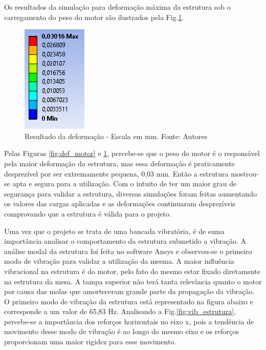       Os resultados da simulação para deformação máxima da estrutura sob o carregamento do peso do motor  são ilustrados pela Fig.\ref{fig:result}.

  \begin{figure}[H]
      \centering
      \includegraphics[scale=0.7]{figuras/result.png}
      \caption{Resultado da deformação - Escala em mm. Fonte: Autores}
      \label{fig:result}
      \end{figure}

      Pelas Figuras \ref{fig:def_motor} e \ref{fig:result}, percebe-se que o peso do motor é o responsável pela maior deformação da estrutura, mas essa deformação é praticamente desprezível por ser extremamente pequena, 0,03 mm. Então a estrutura mostrou-se apta e segura para a utilização.
    Com o intuito de ter um maior grau de segurança para validar a estrutura, diversas simulações foram feitas aumentando os valores das cargas aplicadas e as deformações continuaram desprezíveis comprovando que a estrutura é válida para o projeto.


    Uma vez que o projeto se trata de uma bancada vibratória, é de suma importância analisar o comportamento da estrutura submetido a vibração. A análise modal da estrutura foi feita no software Ansys e observou-se o primeiro modo de vibração para validar a utilização da mesma.
    A maior influência vibracional na estrutura é do motor, pelo fato do mesmo estar fixado diretamente na estrutura da mesa. A tampa superior não terá tanta relevância quanto o motor por causa das molas que amorteceram grande parte da propagação da vibração.
    O primeiro modo de vibração da estrutura está representado na figura abaixo e corresponde a um valor de 65,83 Hz.
    Analisando a Fig.\ref{fig:vib_estrutura}, percebe-se a importância dos reforços horizontais no eixo x, pois a tendência de movimento desse modo de vibração é ao longo do mesmo eixo e os reforços proporcionam uma maior rigidez para esse movimento.


